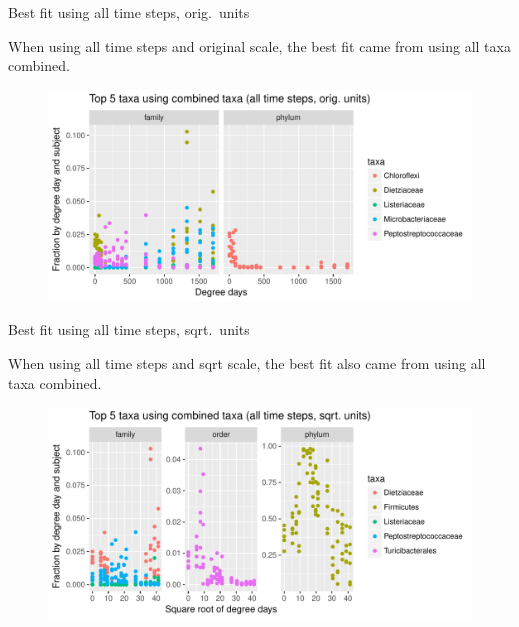 \documentclass{beamer}
\begin{document}
\begin{frame}{Best fit using all time steps, orig.~units}
  
  \noindent When using all time steps and original scale, the best fit came from using all taxa combined.


  \begin{center}
    \begin{figure}
      \includegraphics[width=4.5in]{combined_orig_units_all_data_top_5_taxa}
    \end{figure}
  \end{center}
  \vspace{-0.25in}
  
\end{frame}



\begin{frame}{Best fit using all time steps, sqrt.~units}

  \noindent When using all time steps and sqrt scale, the best fit also came from using all taxa combined.
  
  \begin{center}
    \begin{figure}
      \includegraphics[width=4.5in]{combined_sqrt_units_all_data_top_5_taxa}
    \end{figure}
  \end{center}
  \vspace{-0.25in}

\end{frame}
\end{document}
